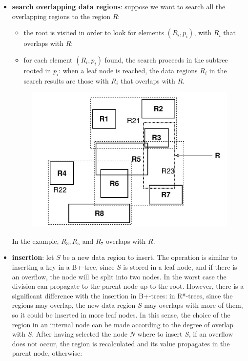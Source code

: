 \begin{itemize}
    \item \textbf{search overlapping data regions}: suppose we want to search all the overlapping regions to the region $R$:
    \begin{itemize}
        \item the root is visited in order to look for elements $(R_i, p_i)$, with $R_i$ that overlaps with $R$;
        \item for each element $(R_i, p_i)$ found, the search proceeds in the subtree rooted in $p_i$: when a leaf node is reached, the data regions $R_i$ in the search results are those with $R_i$ that overlaps with $R$.
    \end{itemize}
    
    \begin{figure}[H]
		\centering
		\includegraphics[scale = 1.5]{img/part9.jpg}
		\label{part6}
    \end{figure}
    
    In the example, $R_3, R_5$ and $R_7$ overlaps with $R$.

    \item \textbf{insertion}: let $S$ be a new data region to insert. The operation is similar to inserting a key in a B+-tree, since $S$ is stored in a leaf node, and if there is an overflow, the node will be split into two nodes. In the worst case the division can propagate to the parent node up to the root. However, there is a significant difference with the insertion in B+-trees: in R*-trees, since the regions may overlap, the new data region $S$ may overlaps with more of them, so it could be inserted in more leaf nodes. In this sense, the choice of the region in an internal node can be made according to the degree of overlap with $S$. After having selected the node $N$ where to insert $S$, if an overflow does not occur, the region is recalculated and its value propagates in the parent node, otherwise:


\end{itemize}
